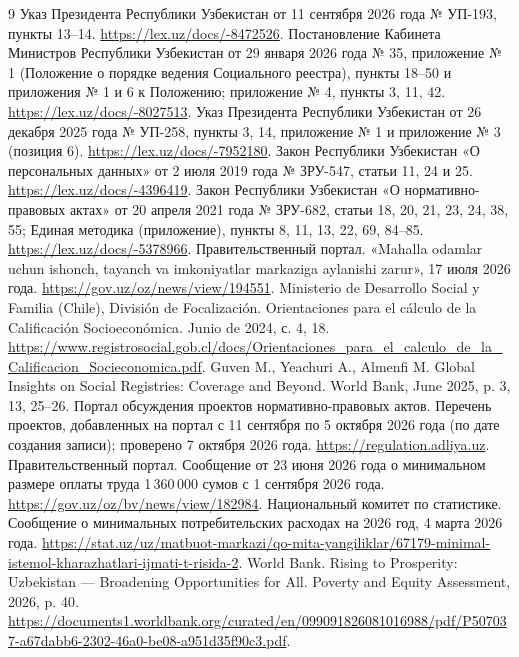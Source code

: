 \documentclass[14pt,a4paper]{extarticle}
\newcommand{\tsize}{\fontsize{12bp}{14.4bp}\selectfont}
\begin{document}
\renewcommand{\refname}{Источники}
\begingroup\tsize
\begin{thebibliography}{9}
 Указ Президента Республики Узбекистан от 11 сентября 2026 года № УП-193, пункты 13–14. \url{https://lex.uz/docs/-8472526}.
 Постановление Кабинета Министров Республики Узбекистан от 29 января 2026 года № 35, приложение № 1 (Положение о порядке ведения Социального реестра), пункты 18–50 и приложения № 1 и 6 к Положению; приложение № 4, пункты 3, 11, 42. \url{https://lex.uz/docs/-8027513}.
 Указ Президента Республики Узбекистан от 26 декабря 2025 года № УП-258, пункты 3, 14, приложение № 1 и приложение № 3 (позиция 6). \url{https://lex.uz/docs/-7952180}.
 Закон Республики Узбекистан «О персональных данных» от 2 июля 2019 года № ЗРУ-547, статьи 11, 24 и 25. \url{https://lex.uz/docs/-4396419}.
 Закон Республики Узбекистан «О нормативно-правовых актах» от 20 апреля 2021 года № ЗРУ-682, статьи 18, 20, 21, 23, 24, 38, 55; Единая методика (приложение), пункты 8, 11, 13, 22, 69, 84–85. \url{https://lex.uz/docs/-5378966}.
 Правительственный портал. «Mahalla odamlar uchun ishonch, tayanch va imkoniyatlar markaziga aylanishi zarur», 17 июля 2026 года. \url{https://gov.uz/oz/news/view/194551}.
 Ministerio de Desarrollo Social y Familia (Chile), División de Focalización. Orientaciones para el cálculo de la Calificación Socioeconómica. Junio de 2024, с. 4, 18. \url{https://www.registrosocial.gob.cl/docs/Orientaciones_para_el_calculo_de_la_Calificacion_Socieconomica.pdf}.
 Guven M., Yeachuri A., Almenfi M. Global Insights on Social Registries: Coverage and Beyond. World Bank, June 2025, p. 3, 13, 25–26.
 Портал обсуждения проектов нормативно-правовых актов. Перечень проектов, добавленных на портал с 11 сентября по 5 октября 2026 года (по дате создания записи); проверено 7 октября 2026 года. \url{https://regulation.adliya.uz}.
 Правительственный портал. Сообщение от 23 июня 2026 года о минимальном размере оплаты труда 1\,360\,000 сумов с 1 сентября 2026 года. \url{https://gov.uz/oz/bv/news/view/182984}.
 Национальный комитет по статистике. Сообщение о минимальных потребительских расходах на 2026 год, 4 марта 2026 года. \url{https://stat.uz/uz/matbuot-markazi/qo-mita-yangiliklar/67179-minimal-istemol-kharazhatlari-ijmati-t-risida-2}.
 World Bank. Rising to Prosperity: Uzbekistan — Broadening Opportunities for All. Poverty and Equity Assessment, 2026, p. 40. \url{https://documents1.worldbank.org/curated/en/099091826081016988/pdf/P507037-a67dabb6-2302-46a0-be08-a951d35f90c3.pdf}.

\end{thebibliography}
\end{document}
